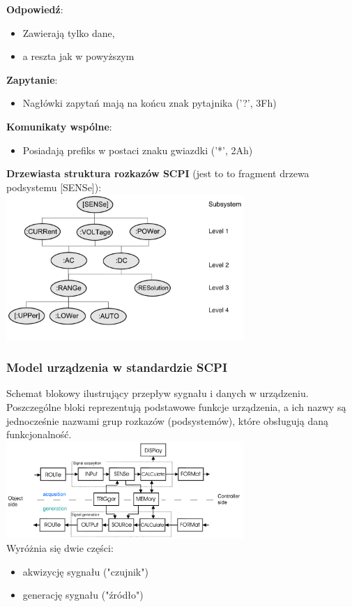 \textbf{Odpowiedź}:
\begin{itemize}
	\item Zawierają tylko dane,  
	\item a reszta jak w powyższym
\end{itemize}
\textbf{Zapytanie}:
\begin{itemize}
	\item Nagłówki zapytań mają na końcu znak pytajnika ('?', 3Fh)
\end{itemize}
\textbf{Komunikaty wspólne}:
\begin{itemize}
	\item Posiadają prefiks w postaci znaku gwiazdki ('*', 2Ah)
\end{itemize}
\textbf{Drzewiasta struktura rozkazów SCPI} (jest to to fragment drzewa podsystemu [SENSe]):\\
\includegraphics[width=9cm]{./wyklady/IEEE488_SCPI_22_1.pdf}

\subsubsection{Model urządzenia w standardzie SCPI}
Schemat blokowy ilustrujący przepływ sygnału i danych w urządzeniu. Poszczególne bloki reprezentują podstawowe funkcje urządzenia, a ich nazwy są jednocześnie nazwami grup rozkazów (podsystemów), które obsługują daną funkcjonalność.\\
\includegraphics[width=9cm]{./wyklady/IEEE488_SCPI_23_1.pdf}\\
Wyróżnia się dwie części:
\begin{itemize}
	\item akwizycję sygnału ("czujnik")
	\item generację sygnału ("źródło")
\end{itemize}

